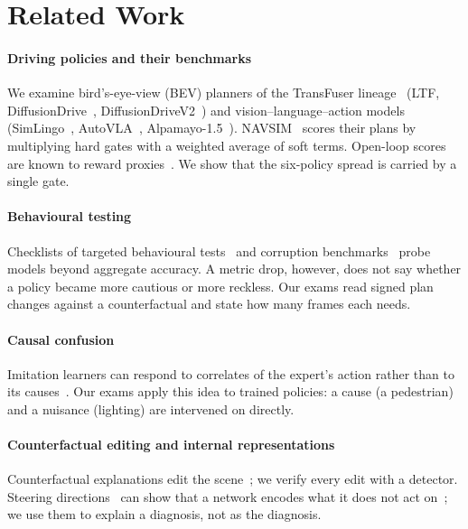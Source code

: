 \section{Related Work}
\label{sec:related}

\paragraph{Driving policies and their benchmarks}
We examine bird's-eye-view (BEV) planners of the TransFuser lineage~\cite{chitta2023transfuser} (LTF,
DiffusionDrive~\cite{liao2025diffusiondrive}, DiffusionDriveV2~\cite{diffusiondrivev2}) and
vision--language--action models (SimLingo~\cite{renz2025simlingo}, AutoVLA~\cite{zhou2025autovla},
Alpamayo-1.5~\cite{nvidia2025alpamayo,nvidia2026alpamayo15}). NAVSIM~\cite{dauner2024navsim,cao2025pseudosim} scores their
plans by multiplying hard gates with a weighted average of soft terms. Open-loop scores are known to
reward proxies~\cite{li2024egostatus}. We show that the six-policy spread is carried by a single gate.

\paragraph{Behavioural testing}
Checklists of targeted behavioural tests~\cite{ribeiro2020checklist} and corruption
benchmarks~\cite{hendrycks2019benchmarking,kong2023robo3d,xie2023robobev} probe models beyond aggregate
accuracy. A metric drop, however, does not say whether a policy became more cautious or more reckless.
Our exams read signed plan changes against a counterfactual and state how many frames each needs.

\paragraph{Causal confusion}
Imitation learners can respond to correlates of the expert's action rather than to its
causes~\cite{dehaan2019causal,wen2020copycat,codevilla2019exploring,geirhos2020shortcut}. Our exams
apply this idea to trained policies: a cause (a pedestrian) and a nuisance (lighting) are intervened
on directly.

\paragraph{Counterfactual editing and internal representations}
Counterfactual explanations edit the scene~\cite{jacob2022steex,zemni2023octet}; we verify every edit
with a detector. Steering directions~\cite{zou2023repe} can show that a network encodes what it does not
act on~\cite{azaria2023internal}; we use them to explain a diagnosis, not as the diagnosis.
